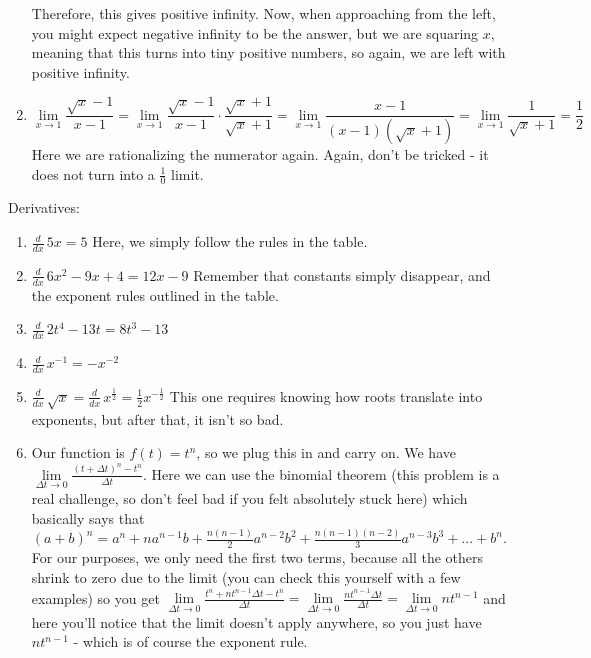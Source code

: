 \begin{enumerate}
Therefore, this gives positive infinity. 
Now, when approaching from the left, you might expect negative infinity to be the answer, but we are squaring $x$, meaning that this turns into tiny positive numbers, so again, we are left with positive infinity.
\item \begin{equation*}
    \lim\limits_{x\rightarrow 1} \frac{\sqrt{x}-1}{x-1} = \lim\limits_{x\rightarrow 1} \frac{\sqrt{x}-1}{x-1} \cdot \frac{\sqrt{x}+1}{\sqrt{x}+1} = \lim\limits_{x\rightarrow 1} \frac{x-1}{(x-1)(\sqrt{x}+1)}=\lim\limits_{x\rightarrow 1} \frac{1}{\sqrt{x}+1} = \frac{1}{2}
\end{equation*}
Here we are rationalizing the numerator again. Again, don't be tricked - it does not turn into a $\frac{1}{0}$ limit.
\end{enumerate}

Derivatives:
\begin{enumerate}
\item $\frac{d}{dx} \, 5x = 5$ Here, we simply follow the rules in the table.
\item $\frac{d}{dx} \, 6x^2 - 9x + 4 = 12x - 9$ Remember that constants simply disappear, and the exponent rules outlined in the table.
\item $\frac{d}{dx} \, 2t^4 - 13t = 8t^3 - 13$
\item $\frac{d}{dx}\, x^{-1} = -x^{-2}$ 
\item $\frac{d}{dx}\, \sqrt{x} = \frac{d}{dx}\, x^{\frac{1}{2}} = \frac{1}{2}x^{-\frac{1}{2}}$ This one requires knowing how roots translate into exponents, but after that, it isn't so bad.
\item Our function is $f(t) = t^n$, so we plug this in and carry on. We have $\lim\limits_{\Delta t\rightarrow 0}\frac{(t+\Delta t)^n-t^n}{\Delta t}$. Here we can use the binomial theorem (this problem is a real challenge, so don't feel bad if you felt absolutely stuck here) which basically says that $(a+b)^n = a^n+na^{n-1}b+\frac{n(n-1)}{2}a^{n-2}b^2+\frac{n(n-1)(n-2)}{3}a^{n-3}b^3+...+b^n$. For our purposes, we only need the first two terms, because all the others shrink to zero due to the limit (you can check this yourself with a few examples) so you get $\lim\limits_{\Delta t\rightarrow 0}\frac{t^n+nt^{n-1}\Delta t-t^n}{\Delta t}=\lim\limits_{\Delta t\rightarrow 0}\frac{nt^{n-1}\Delta t}{\Delta t}=\lim\limits_{\Delta t\rightarrow 0}nt^{n-1}$ and here you'll notice that the limit doesn't apply anywhere, so you just have $nt^{n-1}$ - which is of course the exponent rule.
\end{enumerate}

